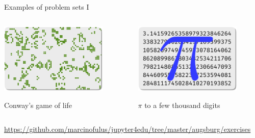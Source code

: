 \documentclass[svgnames]{beamer}
\begin{document}
\begin{frame}{Examples of problem sets I}
 \begin{columns}[t]
  \begin{column}{0.5\textwidth}
   \begin{center}
    \includegraphics[width=0.8\textwidth]{conway}

    Conway's game of life
   \end{center}
  \end{column}%
  \begin{column}{0.5\textwidth}
   \begin{center}
    \includegraphics[width=0.8\textwidth]{pi}

    $\pi$ to a few thousand digits
   \end{center}
  \end{column}%
 \end{columns}

 \vspace{0.4truecm}
 {\scriptsize\url{https://github.com/marcinofulus/jupyter4edu/tree/master/augsburg/exercises}}
\end{frame}
\end{document}
